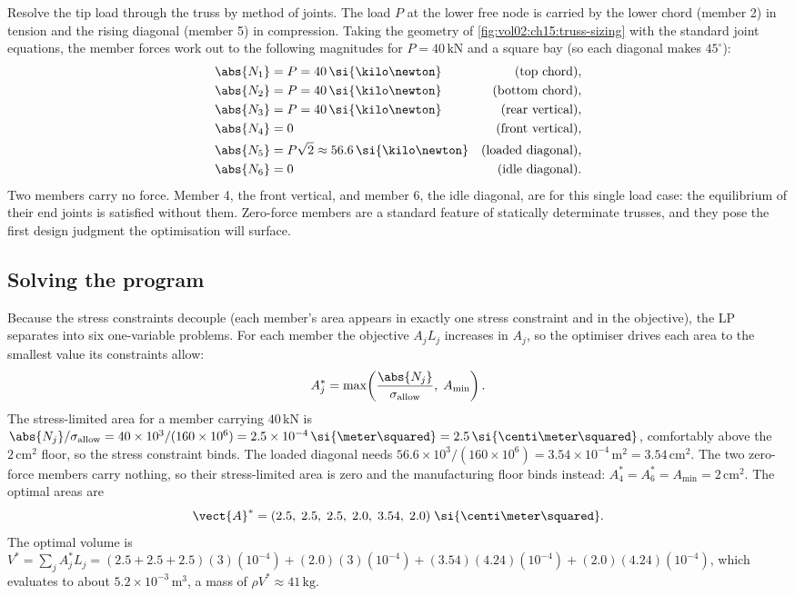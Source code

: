 Resolve the tip load through the truss by method of joints. The
load $P$ at the lower free node is carried by the lower chord
(member 2) in tension and the rising diagonal (member 5) in
compression. Taking the geometry of \cref{fig:vol02:ch15:truss-sizing}
with the standard joint equations, the member forces work out to
the following magnitudes for $P = 40\,\si{\kilo\newton}$ and a
square bay (so each diagonal makes $45^{\circ}$):
\[
\begin{aligned}
\abs{N_{1}} &= P = 40\,\si{\kilo\newton} &\text{(top chord)}, \\
\abs{N_{2}} &= P = 40\,\si{\kilo\newton} &\text{(bottom chord)}, \\
\abs{N_{3}} &= P = 40\,\si{\kilo\newton} &\text{(rear vertical)}, \\
\abs{N_{4}} &= 0 &\text{(front vertical)}, \\
\abs{N_{5}} &= P\sqrt{2} \approx 56.6\,\si{\kilo\newton}
  &\text{(loaded diagonal)}, \\
\abs{N_{6}} &= 0 &\text{(idle diagonal)}.
\end{aligned}
\]
Two members carry no force. Member 4, the front vertical, and
member 6, the idle diagonal, are  for
this single load case: the equilibrium of their end joints is
satisfied without them. Zero-force members are a standard feature
of statically determinate trusses, and they pose the first design
judgment the optimisation will surface.

\subsection{Solving the program}

Because the stress constraints decouple (each member's area appears
in exactly one stress constraint and in the objective), the LP
separates into six one-variable problems. For each member the
objective $A_{j} L_{j}$ increases in $A_{j}$, so the optimiser
drives each area to the smallest value its constraints allow:
\[
A_{j}^{*} = \max\!\left(
\frac{\abs{N_{j}}}{\sigma_{\mathrm{allow}}}, \; A_{\min}
\right).
\]
The stress-limited area for a member carrying $40\,\si{\kilo\newton}$
is $\abs{N_{j}} / \sigma_{\mathrm{allow}} = 40 \times 10^{3} /
(160 \times 10^{6}) = 2.5 \times 10^{-4}\,\si{\meter\squared} =
2.5\,\si{\centi\meter\squared}$, comfortably above the
$2\,\si{\centi\meter\squared}$ floor, so the stress constraint
binds. The loaded diagonal needs $56.6 \times 10^{3} / (160 \times
10^{6}) = 3.54 \times 10^{-4}\,\si{\meter\squared} =
3.54\,\si{\centi\meter\squared}$. The two zero-force members carry
nothing, so their stress-limited area is zero and the
manufacturing floor binds instead: $A_{4}^{*} = A_{6}^{*} =
A_{\min} = 2\,\si{\centi\meter\squared}$. The optimal areas are
\[
\vect{A}^{*} = (2.5, \; 2.5, \; 2.5, \; 2.0, \; 3.54, \; 2.0)
\;\si{\centi\meter\squared}.
\]
The optimal volume is $V^{*} = \sum_{j} A_{j}^{*} L_{j} =
(2.5 + 2.5 + 2.5)(3)(10^{-4}) + (2.0)(3)(10^{-4}) +
(3.54)(4.24)(10^{-4}) + (2.0)(4.24)(10^{-4})$, which evaluates to
about $5.2 \times 10^{-3}\,\si{\meter\cubed}$, a mass of $\rho V^{*}
\approx 41\,\si{\kilogram}$.

